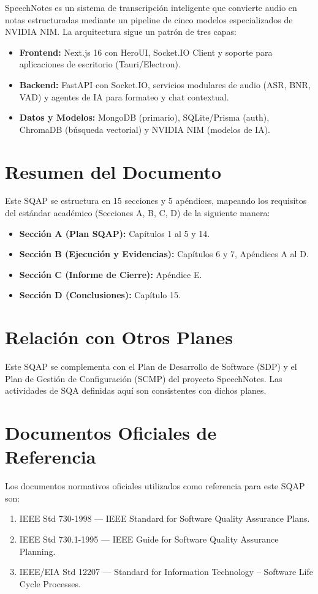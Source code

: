 SpeechNotes es un sistema de transcripción inteligente que convierte audio en notas estructuradas mediante un pipeline de cinco modelos especializados de NVIDIA NIM. La arquitectura sigue un patrón de tres capas:

\begin{itemize}
    \item \textbf{Frontend:} Next.js 16 con HeroUI, Socket.IO Client y soporte para aplicaciones de escritorio (Tauri/Electron).
    \item \textbf{Backend:} FastAPI con Socket.IO, servicios modulares de audio (ASR, BNR, VAD) y agentes de IA para formateo y chat contextual.
    \item \textbf{Datos y Modelos:} MongoDB (primario), SQLite/Prisma (auth), ChromaDB (búsqueda vectorial) y NVIDIA NIM (modelos de IA).
\end{itemize}

\section{Resumen del Documento}
\label{sec:resumen-doc}

Este SQAP se estructura en 15 secciones y 5 apéndices, mapeando los requisitos del estándar académico (Secciones A, B, C, D) de la siguiente manera:

\begin{itemize}
    \item \textbf{Sección A (Plan SQAP):} Capítulos 1 al 5 y 14.
    \item \textbf{Sección B (Ejecución y Evidencias):} Capítulos 6 y 7, Apéndices A al D.
    \item \textbf{Sección C (Informe de Cierre):} Apéndice E.
    \item \textbf{Sección D (Conclusiones):} Capítulo 15.
\end{itemize}

\section{Relación con Otros Planes}
\label{sec:relacion}

Este SQAP se complementa con el Plan de Desarrollo de Software (SDP) y el Plan de Gestión de Configuración (SCMP) del proyecto SpeechNotes. Las actividades de SQA definidas aquí son consistentes con dichos planes.

\section{Documentos Oficiales de Referencia}
\label{sec:referencias}

Los documentos normativos oficiales utilizados como referencia para este SQAP son:

\begin{enumerate}
    \item IEEE Std 730-1998 --- IEEE Standard for Software Quality Assurance Plans.
    \item IEEE Std 730.1-1995 --- IEEE Guide for Software Quality Assurance Planning.
    \item IEEE/EIA Std 12207 --- Standard for Information Technology -- Software Life Cycle Processes.
\end{enumerate}
